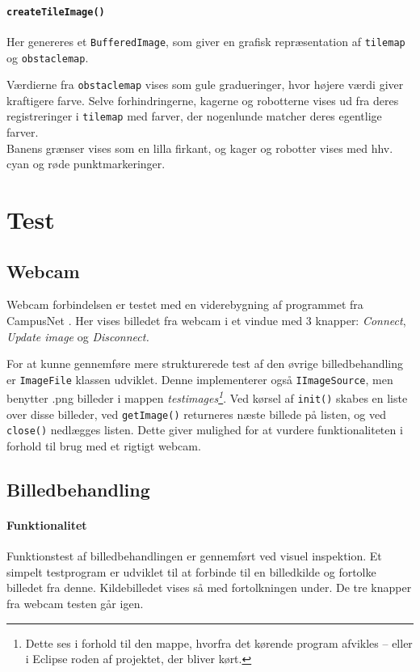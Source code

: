 \paragraph{\texttt{createTileImage()}}
Her genereres et \texttt{BufferedImage}, som giver en grafisk repræsentation af \texttt{tilemap} og \texttt{obstaclemap}.

Værdierne fra \texttt{obstaclemap} vises som gule gradueringer, hvor højere værdi giver kraftigere farve. Selve forhindringerne, kagerne og robotterne vises ud fra deres registreringer i \texttt{tilemap} med farver, der nogenlunde matcher deres egentlige farver.\\
Banens grænser vises som en lilla firkant, og kager og robotter vises med hhv. cyan og røde punktmarkeringer.
\begin{comment}
Webcam
	mode
	player?
	
Processor
	Thresholds
	Resolution
\end{comment}

\section{Test}
\subsection{Webcam}
Webcam forbindelsen er testet med en viderebygning af programmet fra CampusNet . Her vises billedet fra webcam i et vindue med 3 knapper: \textit{Connect}, \textit{Update image} og \textit{Disconnect.}

For at kunne gennemføre mere strukturerede test af den øvrige billedbehandling er \texttt{ImageFile} klassen udviklet. Denne implementerer også \texttt{IImageSource}, men benytter .png billeder i mappen \textit{testimages\footnote{Dette ses i forhold til den mappe, hvorfra det kørende program afvikles -- eller i Eclipse roden af projektet, der bliver kørt.}}. Ved kørsel af \texttt{init()} skabes en liste over disse billeder, ved \texttt{getImage()} returneres næste billede på listen, og ved \texttt{close()} nedlægges listen. Dette giver mulighed for at vurdere funktionaliteten i forhold til brug med et rigtigt webcam.

\subsection{Billedbehandling}
\paragraph{Funktionalitet}
Funktionstest af billedbehandlingen er gennemført ved visuel inspektion. Et simpelt testprogram er udviklet til at forbinde til en billedkilde og fortolke billedet fra denne. Kildebilledet vises så med fortolkningen under. De tre knapper fra webcam testen går igen.


